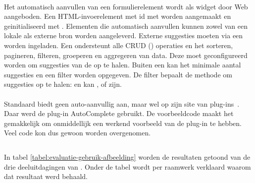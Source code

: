 \paragraph{\kendo}
Het automatisch aanvullen van een formulierelement wordt als widget door \kendo{} Web aangeboden.
Een HTML-invoerelement met id met worden aangemaakt en geinitialiseerd met .
Elementen die automatisch aanvullen kunnen zowel van een lokale als externe bron worden aangeleverd.
Externe suggesties moeten via een  worden ingeladen.
Een  ondersteunt alle CRUD () operaties en het sorteren, pagineren, filteren, groeperen en aggregeren van data.
Deze moet geconfigureerd worden om suggesties van de  op te halen.
Buiten een  kan het minimale aantal suggesties en een filter worden opgegeven.
De filter bepaalt de methode om suggesties op te halen:  en kan ,  of  zijn.

\paragraph{\lungo}
Standaard biedt \lungo{} geen auto-aanvullig aan, maar wel op zijn site van plug-ins~\cite{TapQuo2013b}.
Daar werd de plug-in AutoComplete gebruikt.
De voorbeeldcode maakt het gemakkelijk om onmiddellijk een werkend voorbeeld van de plug-in te hebben.
Veel code kon dus gewoon worden overgenomen.


\subsection{}
\label{sec:evaluatie-gebruik-afbeelding}

In tabel \ref{tabel:evaluatie-gebruik-afbeelding} worden de resultaten getoond van de drie deeluitdagingen van .
Onder de tabel wordt per raamwerk verklaard waarom dat resultaat werd behaald.

